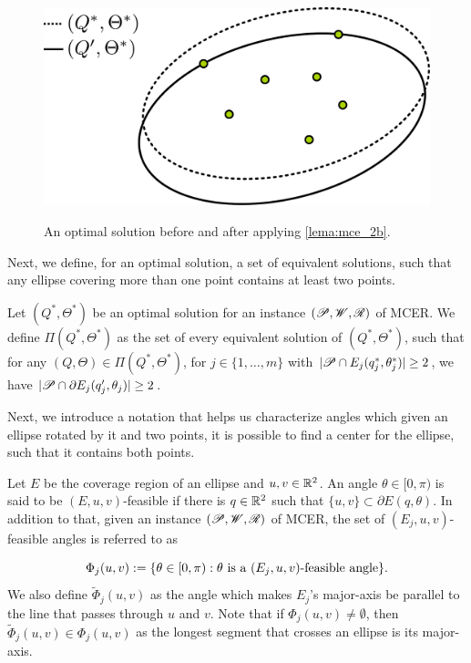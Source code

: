 \begin{figure}
	\centering
	\caption{An optimal solution before and after applying \autoref{lema:mce_2b}.}
	\includegraphics[scale=.28]{tex/figures/ellipse-2-points}
	\fautor
	\label{fig:ellipse-2-points}
\end{figure}

Next, we define, for an optimal solution, a set of equivalent solutions, such that any ellipse covering more than one point contains at least two points.

\begin{definicao}
	Let $(Q^*, \Theta^*)$ be an optimal solution for an instance $(\mathscr{P}, \mathscr{W}, \mathscr{R})$ of MCER. We define $\Pi(Q^*, \Theta^*)$ as the set of every equivalent solution of $(Q^*, \Theta^*)$, such that for any $(Q, \Theta)\in\Pi(Q^*, \Theta^*)$, for $j\in\{1, \dots, m\}$ with $|\mathscr{P} \cap E_j(q_j^*, \theta_j^*)|\ge2$, we have $|\mathscr{P} \cap \partial E_j(q_j', \theta_j)| \ge 2$.
\end{definicao}

Next, we introduce a notation that helps us characterize angles which given an ellipse rotated by it and two points, it is possible to find a center for the ellipse, such that it contains both points.

\begin{definicao}\label{def:feasible_angle}
	Let $E$ be the coverage region of an ellipse and $u, v \in \mathbb{R}^2$. An angle $\theta \in [0, \pi)$ is said to be $(E, u, v)$-feasible if there is $q \in \mathbb{R}^2$ such that $\{u, v\} \subset \partial E(q, \theta)$.
	In addition to that, given an instance  $(\mathscr{P}, \mathscr{W}, \mathscr{R})$ of MCER, the set of $(E_j, u, v)$-feasible angles is referred to as 
	
	\begin{equation}
	\Phi_j(u, v) := \{\theta \in [0, \pi) : \theta \textnormal{ is a } (E_j,u,v)\textnormal{-feasible angle}\}.
	\end{equation}
	We also define $\tilde{\Phi}_j(u,v)$ as the angle which makes $E_j$'s major-axis be parallel to the line that passes through $u$ and $v$. Note that if $\Phi_j(u,v) \neq \emptyset$, then $\tilde{\Phi}_j(u,v) \in \Phi_j(u,v)$ as the longest segment that crosses an ellipse is its major-axis.
\end{definicao}

